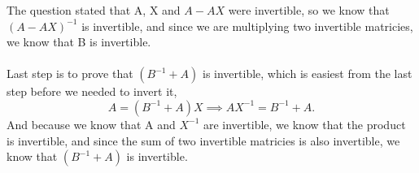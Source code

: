 \documentclass{report}
\begin{document}
The question stated that A, X and $ A-AX $ were invertible, so we know that $ \left( A-AX \right) ^{ -1 } $ is invertible, and since we are multiplying two invertible matricies, we know that B is invertible. \\\\
Last step is to prove that $ \left( B^{ -1 }+A \right)  $ is invertible, which is easiest from the last step before we needed to invert it,
\[
A=\left( B^{ -1 }+A \right) X \implies AX^{ -1 }= B^{ -1 }+A
.\] 
And because we know that A and $ X^{ -1 } $ are invertible, we know that the product is invertible, and since the sum of two invertible matricies is also invertible, we know that $ \left( B^{ -1 }+A \right)  $ is invertible. \\\\
\end{document}
